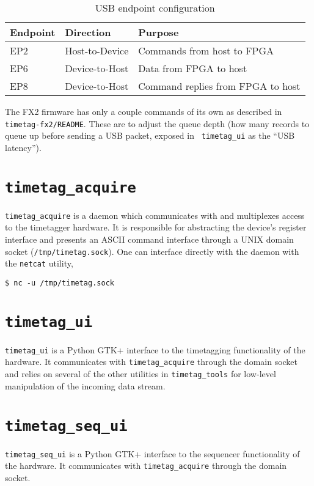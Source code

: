 \begin{table}
  \begin{tabular}{|lll|}
    \hline
    Endpoint & Direction      & Purpose \\
    \hline
    EP2      & Host-to-Device & Commands from host to FPGA \\
    EP6      & Device-to-Host & Data from FPGA to host \\
    EP8      & Device-to-Host & Command replies from FPGA to host \\
    \hline
  \end{tabular}
  \caption{USB endpoint configuration}
  \label{Table:Endpoints}
\end{table}

The FX2 firmware has only a couple commands of its own as described in
{\tt timetag-fx2/README}. These are to adjust the queue depth (how
many records to queue up before sending a USB packet, exposed in {\tt
  timetag\_ui} as the ``USB latency'').

\section{\tt timetag\_acquire}
{\tt timetag\_acquire} is a daemon which communicates with and
multiplexes access to the timetagger hardware. It is responsible for
abstracting the device's register interface and presents an ASCII
command interface through a UNIX domain socket
({\tt /tmp/timetag.sock}). One can interface directly with the daemon
with the {\tt netcat} utility,

\begin{verbatim}
$ nc -u /tmp/timetag.sock
\end{verbatim}

\section{\tt timetag\_ui}

{\tt timetag\_ui} is a Python GTK+ interface to the timetagging
functionality of the hardware. It communicates with
{\tt timetag\_acquire} through the domain socket and relies on several
of the other utilities in {\tt timetag\_tools} for low-level
manipulation of the incoming data stream.

\section{\tt timetag\_seq\_ui}
{\tt timetag\_seq\_ui} is a Python GTK+ interface to the sequencer
functionality of the hardware. It communicates with
{\tt timetag\_acquire} through the domain socket.

